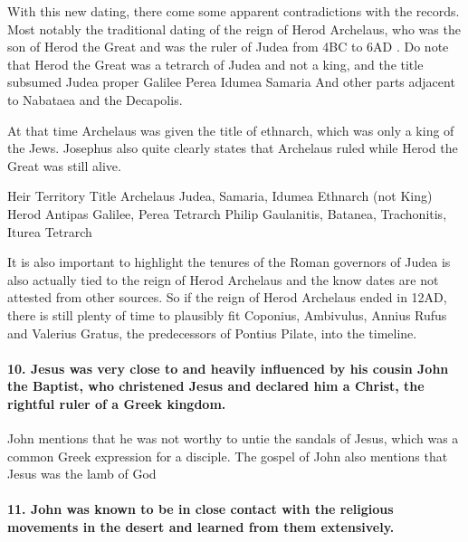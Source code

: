 With this new dating, there come some apparent contradictions with the records.
Most notably the traditional dating of the reign of Herod Archelaus, who was the son of Herod the Great and was the ruler of Judea from 4BC to 6AD .
Do note that Herod the Great was a tetrarch of Judea and not a king, and the title subsumed Judea proper Galilee Perea Idumea Samaria And other parts adjacent to Nabataea and the Decapolis.

At that time Archelaus was given the title of ethnarch, which was only a king of the Jews.
Josephus also quite clearly states that Archelaus ruled while Herod the Great was still alive.

Heir Territory Title Archelaus Judea, Samaria, Idumea Ethnarch (not King) Herod Antipas Galilee, Perea Tetrarch Philip Gaulanitis, Batanea, Trachonitis, Iturea Tetrarch

It is also important to highlight the tenures of the Roman governors of Judea is also actually tied to the reign of Herod Archelaus and the know dates are not attested from other sources.
So if the reign of Herod Archelaus ended in 12AD, there is still plenty of time to plausibly fit Coponius, Ambivulus, Annius Rufus and Valerius Gratus, the predecessors of Pontius Pilate, into the timeline.



\paragraph{10.
Jesus was very close to and heavily influenced by his cousin John the Baptist, who christened Jesus and declared him a Christ, the rightful ruler of a Greek kingdom.}\label{par:jesus-was-very-close-to-and-heavily-influenced-by-his-cousin-john-the-baptist-who-christened-jesus-and-declared-him-a-christ-the-rightful-ruler-of-a-greek-kingdom.}

John mentions that he was not worthy to untie the sandals of Jesus, which was a common Greek expression for a disciple.
The gospel of John also mentions that Jesus was the lamb of God

\paragraph{11.
John was known to be in close contact with the religious movements in the desert and learned from them extensively.}\label{par:john-was-known-to-be-in-close-contact-with-the-religious-movements-in-the-desert-and-learned-from-them-extensively.}

